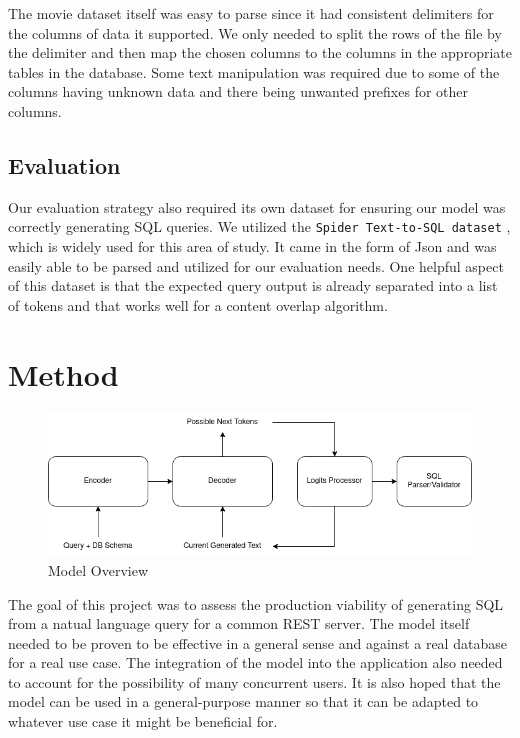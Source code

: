 \documentclass[11pt]{article}
\begin{document}
The movie dataset itself was easy to parse since it had consistent delimiters for the columns of data it supported. We only needed to split the rows of the file by the delimiter and then map the chosen columns to the columns in the appropriate tables in the database. Some text manipulation was required due to some of the columns having unknown data and there being unwanted prefixes for other columns.

\subsection{Evaluation}

Our evaluation strategy also required its own dataset for ensuring our model was correctly generating SQL queries. We utilized the \texttt{Spider Text-to-SQL dataset} \citep{yu2019spider}, which is widely used for this area of study. It came in the form of Json and was easily able to be parsed and utilized for our evaluation needs. One helpful aspect of this dataset is that the expected query output is already separated into a list of tokens and that works well for a content overlap algorithm.

\section{Method}

\begin{figure}
\centering
\includegraphics[width=\textwidth]{t5-transformer.drawio.png}
\caption{\label{fig:model} Model Overview}
\end{figure}

The goal of this project was to assess the production viability of generating SQL from a natual language query for a common REST server. The model itself needed to be proven to be effective in a general sense and against a real database for a real use case. The integration of the model into the application also needed to account for the possibility of many concurrent users. It is also hoped that the model can be used in a general-purpose manner so that it can be adapted to whatever use case it might be beneficial for.
\end{document}
